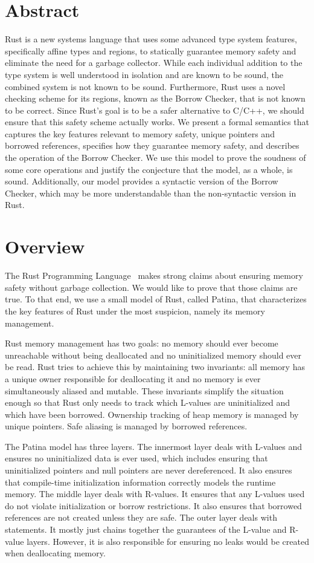 \section*{Abstract}
Rust is a new systems language that uses some advanced type system features,
specifically affine types and regions, to statically guarantee memory
safety and eliminate the need for a garbage collector.
While each individual addition to the type system is well understood
in isolation and are known to be sound, the combined system is not known to be sound.
Furthermore, Rust uses a novel checking scheme for its regions, known
as the Borrow Checker, that is not known to be correct.
Since Rust's goal is to be a safer alternative to C/C++, we should
ensure that this safety scheme actually works. We present a formal
semantics that captures the key features relevant to memory safety,
unique pointers and borrowed references, specifies how they guarantee
memory safety, and describes the operation of the Borrow Checker.
We use this model to prove the soudness of some core operations
and justify the conjecture that the model, as a whole, is sound.
Additionally, our model provides a syntactic version of the Borrow
Checker, which may be more understandable than the non-syntactic version
in Rust.

\section*{Overview}
The Rust Programming Language~\cite{rust} makes strong claims about 
ensuring memory safety without garbage collection.
We would like to prove that those claims are true.
To that end, we use a small model of Rust, called Patina, that characterizes the key
features of Rust under the most suspicion, namely its memory management.

Rust memory management has two goals:
no memory should ever become unreachable without being deallocated
and no uninitialized memory should ever be read.
Rust tries to achieve this by maintaining two invariants:
all memory has a unique owner responsible for deallocating it and
no memory is ever simultaneously aliased and mutable.
These invariants simplify the situation enough so that
Rust only needs to track which L-values are uninitialized and which have been borrowed.
Ownership tracking of heap memory is managed by unique pointers.
Safe aliasing is managed by borrowed references.

The Patina model has three layers.
The innermost layer deals with L-values and ensures 
no uninitialized data is ever used, which includes ensuring
that uninitialized pointers and null pointers are never dereferenced.
It also ensures that compile-time initialization information correctly
models the runtime memory.
The middle layer deals with R-values.
It ensures that any L-values used do not violate initialization or borrow restrictions.
It also ensures that borrowed references are not created unless they are safe.
The outer layer deals with statements.
It mostly just chains together the guarantees of the L-value and R-value layers.
However, it is also responsible for ensuring no leaks would be created when deallocating memory.


